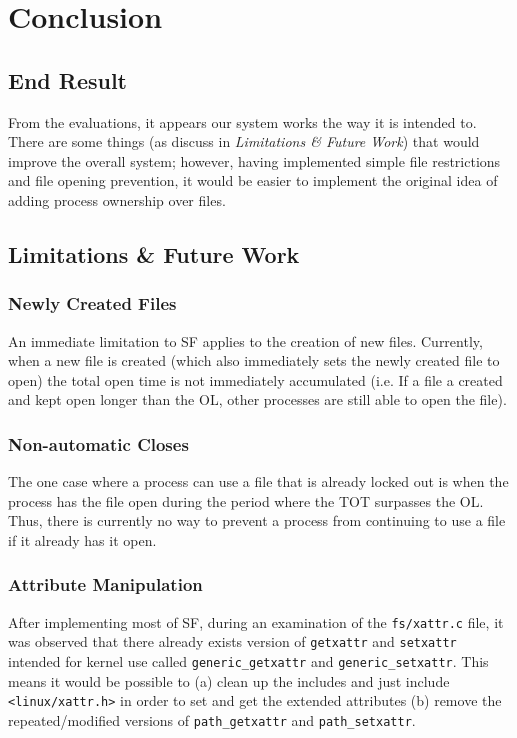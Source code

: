\section{Conclusion}

\subsection{End Result}

From the evaluations, it appears our system works the way it is intended to. There are some things (as discuss in \textit{Limitations \& Future Work}) that would improve the overall system; however, having implemented simple file restrictions and file opening prevention, it would be easier to implement the original idea of adding process ownership over files.

\subsection{Limitations \& Future Work}

\subsubsection*{Newly Created Files}

An immediate limitation to SF applies to the creation of new files. Currently, when a new file is created (which also immediately sets the newly created file to open) the total open time is not immediately accumulated (i.e. If a file a created and kept open longer than the OL, other processes are still able to open the file).

\subsubsection*{Non-automatic Closes}

The one case where a process can use a file that is already locked out is when the process has the file open during the period where the TOT surpasses the OL. Thus, there is currently no way to prevent a process from continuing to use a file if it already has it open.

\subsubsection*{Attribute Manipulation}

After implementing most of SF, during an examination of the \texttt{fs/xattr.c} file, it was observed that there already exists version of \texttt{getxattr} and \texttt{setxattr} intended for kernel use called \texttt{generic\_getxattr} and \texttt{generic\_setxattr}. This means it would be possible to (a) clean up the includes and just include \texttt{<linux/xattr.h>} in order to set and get the extended attributes (b) remove the repeated/modified versions of \texttt{path\_getxattr} and \texttt{path\_setxattr}.

